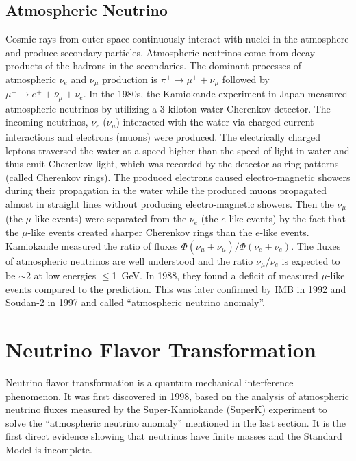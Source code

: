 \subsection{Atmospheric Neutrino}
Cosmic rays from outer space continuously interact with nuclei in the atmosphere and produce secondary particles. Atmospheric neutrinos come from decay products of the hadrons in the secondaries. The dominant processes of atmospheric $\nu_e$ and $\nu_\mu$ production is $\pi^+\to\mu^+ + \nu_\mu$ followed by $\mu^+ \to e^+ + \bar{\nu}_\mu + \nu_e$. In the 1980s, the Kamiokande experiment in Japan measured atmospheric neutrinos by utilizing a 3-kiloton water-Cherenkov detector. The incoming neutrinos, $\nu_e$ ($\nu_\mu$) interacted with the water via charged current interactions and electrons (muons) were produced. The electrically charged leptons traversed the water at a speed higher than the speed of light in water and thus emit Cherenkov light, which was recorded by the detector as ring patterns (called Cherenkov rings). The produced electrons caused electro-magnetic showers during their propagation in the water while the produced muons propagated almost in straight lines without producing electro-magnetic showers. Then the $\nu_\mu$ (the $\mu$-like events) were separated from the $\nu_e$ (the $e$-like events) by the fact that the $\mu$-like events created sharper Cherenkov rings than the $e$-like events. Kamiokande measured the ratio of fluxes $\Phi(\nu_\mu+\bar{\nu}_\mu)/\Phi(\nu_e+\bar{\nu}_e)$. The fluxes of atmospheric neutrinos are well understood and the ratio $\nu_\mu/\nu_e$ is expected to be $\sim$2 at low energies $\leq$1~GeV. In 1988, they found a deficit of measured $\mu$-like events compared to the prediction. This was later confirmed by IMB in 1992\cite{becker1992electron} and Soudan-2 in 1997\cite{allison1997measurement} and called ``atmospheric neutrino anomaly''\cite{kajita2012atmospheric}.

\section{Neutrino Flavor Transformation}
Neutrino flavor transformation is a quantum mechanical interference phenomenon\cite{akhmedov2019quantum}. It was first discovered in 1998, based on the analysis of atmospheric neutrino fluxes measured by the Super-Kamiokande (SuperK) experiment to solve the ``atmospheric neutrino anomaly'' mentioned in the last section\cite{fukuda1998evidence}. It is the first direct evidence showing that neutrinos have finite masses and the Standard Model is incomplete.

